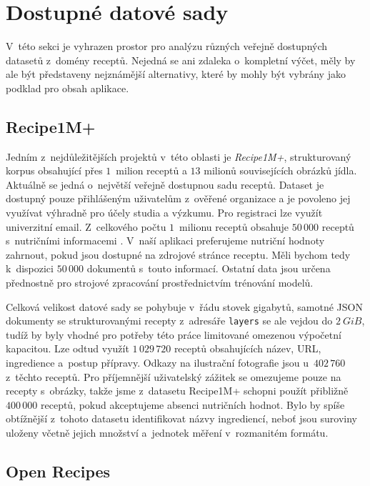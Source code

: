 \section{Dostupné datové sady}

V~této sekci je vyhrazen prostor pro analýzu různých veřejně dostupných datasetů z~domény receptů. Nejedná se ani zdaleka o~kompletní výčet, měly by ale být představeny nejznámější alternativy, které by mohly být vybrány jako podklad pro obsah aplikace. 

\subsection{Recipe1M+}

Jedním z~nejdůležitějších projektů v~této oblasti je \emph{Recipe1M+}, strukturovaný korpus obsahující přes $1$~milion receptů a $13$ milionů souvisejících obrázků jídla. Aktuálně se jedná o~největší veřejně dostupnou sadu receptů. Dataset je dostupný pouze přihlášeným uživatelům z~ověřené organizace a je povoleno jej využívat výhradně pro účely studia a výzkumu. Pro registraci lze využít univerzitní email. Z~celkového počtu $1$~milionu receptů obsahuje $50\,000$ receptů s~nutričními informacemi \citep{marin2019learning}. V~naší aplikaci preferujeme nutriční hodnoty zahrnout, pokud jsou dostupné na zdrojové stránce receptu. Měli bychom tedy k~dispozici $50\,000$ dokumentů s~touto informací. Ostatní data jsou určena přednostně pro strojové zpracování prostřednictvím trénování modelů.

Celková velikost datové sady se pohybuje v~řádu stovek gigabytů, samotné JSON dokumenty se strukturovanými recepty z~adresáře \texttt{layers} se ale vejdou do $2~GiB$, tudíž by byly vhodné pro potřeby této práce limitované omezenou výpočetní kapacitou. Lze odtud využít $1\,029\,720$ receptů obsahujících název, URL, ingredience a~postup přípravy. Odkazy na ilustrační fotografie jsou u~$402\,760$ z~těchto receptů. Pro příjemnější uživatelský zážitek se omezujeme pouze na recepty s~obrázky, takže jsme z~datasetu Recipe1M+ schopni použít přibližně $400\,000$ receptů, pokud akceptujeme absenci nutričních hodnot. Bylo by spíše obtížnější z~tohoto datasetu identifikovat názvy ingrediencí, neboť jsou suroviny uloženy včetně jejich množství a~jednotek měření v~rozmanitém formátu.

\subsection{Open Recipes}

